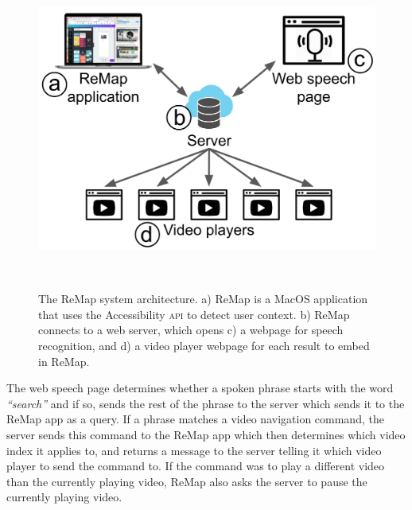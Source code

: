 \begin{figure}[t!]
\centering
  \includegraphics[width=.7\textwidth]{remap/figures/system.png}
  \caption{The ReMap system architecture. a) ReMap is a MacOS application that uses the Accessibility \textsc{api} to detect user context. b) ReMap connects to a web server, which opens c) a webpage for speech recognition, and d) a video player webpage for each result to embed in ReMap.}~\label{fig:remap_system}
\end{figure}

The web speech page determines whether a spoken phrase starts with the word \textit{``search''} and if so, sends the rest of the phrase to the server which sends it to the ReMap app as a query. If a phrase matches a video navigation command, the server sends this command to the ReMap app which then determines which video index it applies to, and returns a message to the server telling it which video player to send the command to. If the command was to play a different video than the currently playing video, ReMap also asks the server to pause the currently playing video.
